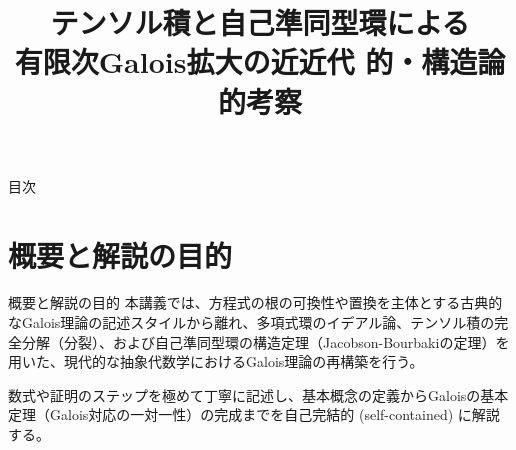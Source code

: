 \documentclass[11pt]{beamer}
\title{テンソル積と自己準同型環による\\有限次Galois拡大の近近代 的・構造論的考察}
\author{}
\date{}
\begin{document}
\frame{\titlepage}

\begin{frame}{目次}
    \tableofcontents
\end{frame}

\section{概要と解説の目的}
\begin{frame}[allowframebreaks]{概要と解説の目的}
    本講義では、方程式の根の可換性や置換を主体とする古典的なGalois理論の記述スタイルから離れ、多項式環のイデアル論、テンソル積の完全分解（分裂）、および自己準同型環の構造定理（Jacobson-Bourbakiの定理）を用いた、現代的な抽象代数学におけるGalois理論の再構築を行う。
    
    数式や証明のステップを極めて丁寧に記述し、基本概念の定義からGaloisの基本定理（Galois対応の一対一性）の完成までを自己完結的 (self-contained) に解説する。
\end{frame}
\end{document}
